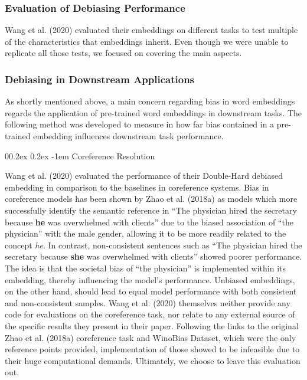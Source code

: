 \documentclass[
  english,
  man,floatsintext]{apa6}
\makeatletter
\let\oldparagraph\paragraph
\renewcommand{\paragraph}[1]{\oldparagraph{#1}\mbox{}}
\renewcommand{\paragraph}{\@startsection{paragraph}{4}{\parindent}%
  {0\baselineskip \@plus 0.2ex \@minus 0.2ex}%
  {-1em}%
  {\normalfont\normalsize\bfseries\itshape\typesectitle}}
\makeatother
\begin{document}
\hypertarget{evaluation-of-debiasing-performance}{%
\subsubsection{Evaluation of Debiasing Performance}\label{evaluation-of-debiasing-performance}}

Wang et al. (2020) evaluated their embeddings on different tasks to test multiple of the characteristics that embeddings inherit. Even though we were unable to replicate all those tests, we focused on covering the main aspects.

\hypertarget{debiasing-in-downstream-applications}{%
\subsubsection{Debiasing in Downstream Applications}\label{debiasing-in-downstream-applications}}

As shortly mentioned above, a main concern regarding bias in word embeddings regards the application of pre-trained word embeddings in downstream tasks. The following method was developed to measure in how far bias contained in a pre-trained embedding influences downstream task performance.

\hypertarget{coreference-resolution}{%
\paragraph{Coreference Resolution}\label{coreference-resolution}}

Wang et al. (2020) evaluated the performance of their Double-Hard debiased embedding in comparison to the baselines in coreference systems. Bias in coreference models has been shown by Zhao et al. (2018a) as models which more successfully identify the semantic reference in \enquote{The physician hired the secretary because \textbf{he} was overwhelmed with clients} due to the biased association of \enquote{the physician} with the male gender, allowing it to be more readily related to the concept \emph{he}. In contrast, non-consistent sentences such as \enquote{The physician hired the secretary because \textbf{she} was overwhelmed with clients} showed poorer performance. The idea is that the societal bias of \enquote{the physician} is implemented within its embedding, thereby influencing the model's performance. Unbiased embeddings, on the other hand, should lead to equal model performance with both consistent and non-consistent samples.
Wang et al. (2020) themselves neither provide any code for evaluations on the coreference task, nor relate to any external source of the specific results they present in their paper. Following the links to the original Zhao et al. (2018a) coreference task and WinoBias Dataset, which were the only reference points provided, implementation of those showed to be infeasible due to their huge computational demands. Ultimately, we choose to leave this evaluation out.
\end{document}
